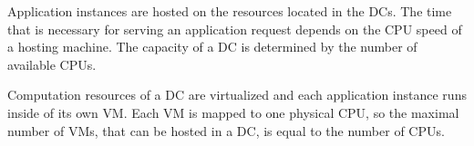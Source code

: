 

Application instances are hosted on the resources located in the \ac{DC}s.
The time that is necessary for serving an application request depends on the CPU speed of a hosting machine.
The capacity of a \ac{DC} is determined by the number of available CPUs. 


Computation resources of a \ac{DC} are virtualized and each application instance runs inside of its own \ac{VM}. Each \ac{VM} is mapped to one physical CPU, so the maximal number of \ac{VM}s, that can be hosted in a \ac{DC}, is equal to the number of CPUs.

